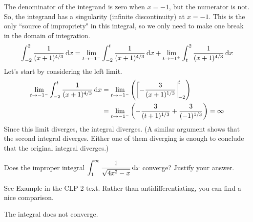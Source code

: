 \begin{solution}
The denominator of the integrand is zero when $x=-1$, but the numerator is not. So, the integrand has a singularity (infinite discontinuity) at $x=-1$. This is the only ``source of impropriety" in this integral, so we only need to make one break in the domain of integration.
\begin{equation*}
\int_{-2}^2\frac{1}{(x+1)^{4/3}}\,\mathrm{d}x
=\lim_{t\rightarrow -1^-}\int_{-2}^t \frac{1}{(x+1)^{4/3}}\,\mathrm{d}x
  +\lim_{t\rightarrow -1^+}\int_t^2 \frac{1}{(x+1)^{4/3}}\,\mathrm{d}x
\end{equation*}
Let's start by considering the left limit.
\begin{align*}
\lim_{t \to -1^-}\int_{-2}^t \frac{1}{(x+1)^{4/3}}\,\mathrm{d}x
&=\lim_{t \to -1^-}\left(\left[-\frac{3}{(x+1)^{1/3}}\right|_{-2}^t\right)\\
&=\lim_{t \to -1^-}\left(-\frac{3}{(t+1)^{1/3}}+\frac{3}{(-1)^{1/3}}\right)=\infty
\end{align*}
Since this limit diverges, the integral diverges. (A similar argument shows
that the second integral diverges. Either one of them diverging is enough to conclude that the
original integral diverges.)
\end{solution}


\begin{question}[1997D]
 Does the improper integral
$\displaystyle\int_1^\infty\frac{1}{\sqrt{4x^2-x}}\,\mathrm{d}x$ converge? Justify your
answer.
\end{question}

\begin{hint}
See Example  in the
CLP-2 text. Rather than antidifferentiating, you can find a nice comparison.
\end{hint}

\begin{answer}
The integral does not converge.
\end{answer}


